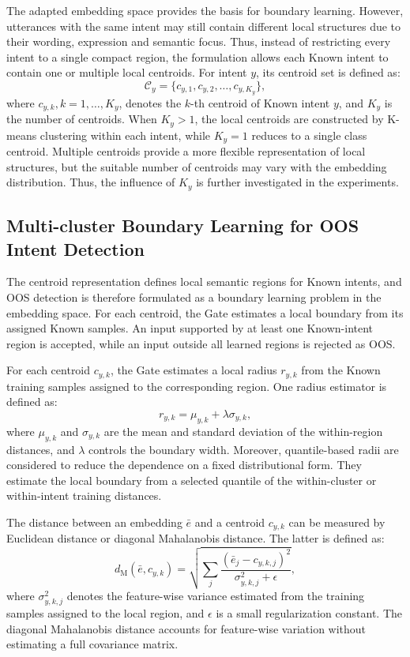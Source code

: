 \documentclass[11pt]{article}
\begin{document}
The adapted embedding space provides the basis for boundary learning. However, utterances with the same intent may still contain different local structures due to their wording, expression and semantic focus. Thus, instead of restricting every intent to a single compact region, the formulation allows each Known intent to contain one or multiple local centroids. For intent $y$, its centroid set is defined as:
\begin{equation}
\mathcal{C}_{y}=\{c_{y,1},c_{y,2},\ldots,c_{y,K_y}\},
\label{eq:ky}
\end{equation}
where $c_{y,k},k=1,\dots,K_y$, denotes the $k$-th centroid of Known intent $y$, and $K_y$ is the number of centroids. When $K_y>1$, the local centroids are constructed by K-means clustering within each intent, while $K_y=1$ reduces to a single class centroid. Multiple centroids provide a more flexible representation of local structures, but the suitable number of centroids may vary with the embedding distribution. Thus, the influence of $K_y$ is further investigated in the experiments.

\subsection{Multi-cluster Boundary Learning for OOS Intent Detection}

The centroid representation defines local semantic regions for Known intents, and OOS detection is therefore formulated as a boundary learning problem in the embedding space. For each centroid, the Gate estimates a local boundary from its assigned Known samples. An input supported by at least one Known-intent region is accepted, while an input outside all learned regions is rejected as OOS.

For each centroid $c_{y,k}$, the Gate estimates a local radius $r_{y,k}$ from the Known training samples assigned to the corresponding region. One radius estimator is defined as:
\begin{equation}
r_{y,k}=\mu_{y,k}+\lambda\sigma_{y,k},
\label{eq:lambda}
\end{equation}
where $\mu_{y,k}$ and $\sigma_{y,k}$ are the mean and standard deviation of the within-region distances, and $\lambda$ controls the boundary width. Moreover, quantile-based radii are considered to reduce the dependence on a fixed distributional form. They estimate the local boundary from a selected quantile of the within-cluster or within-intent training distances.

The distance between an embedding $\bar{e}$ and a centroid $c_{y,k}$ can be measured by Euclidean distance or diagonal Mahalanobis distance. The latter is defined as:
\begin{equation}
d_{\mathrm{M}}(\bar{e},c_{y,k})=\sqrt{\sum_j\frac{(\bar{e}_j-c_{y,k,j})^2}{\sigma_{y,k,j}^{2}+\epsilon}},
\end{equation}
where $\sigma_{y,k,j}^{2}$ denotes the feature-wise variance estimated from the training samples assigned to the local region, and $\epsilon$ is a small regularization constant. The diagonal Mahalanobis distance accounts for feature-wise variation without estimating a full covariance matrix.
\end{document}
